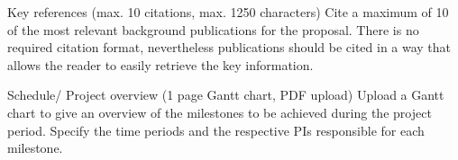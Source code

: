 \documentclass[a4paper,12pt]{article}
\begin{document}
Key references (max. 10 citations, max. 1250 characters)
Cite a maximum of 10 of the most relevant background publications for the proposal. There is no required citation format, nevertheless publications should be cited in a way that allows the reader to easily retrieve the key information.

Schedule/ Project overview (1 page Gantt chart, PDF upload)
Upload a Gantt chart to give an overview of the milestones to be achieved during the project period. Specify the time periods and the respective PIs responsible for each milestone.


%
%
%
%
%
%
%
%
%
\end{document}
